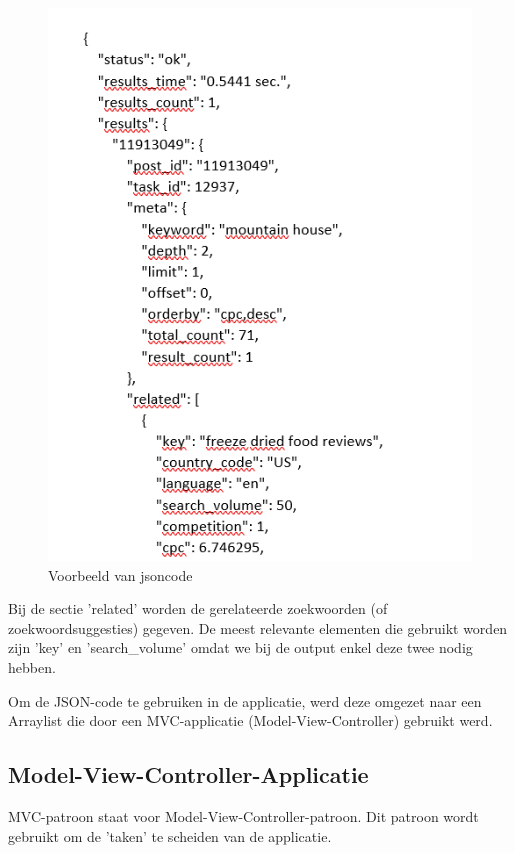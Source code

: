 \begin{figure}[h!]
\centering
\includegraphics[width=\linewidth]{img/jsoncode.PNG}
\caption{Voorbeeld van jsoncode}
\end{figure}

Bij de sectie 'related' worden de gerelateerde zoekwoorden (of zoekwoordsuggesties) gegeven. De meest relevante elementen die gebruikt worden zijn 'key' en 'search\_volume' omdat we bij de output enkel deze twee nodig hebben. 

Om de JSON-code te gebruiken in de applicatie, werd deze omgezet naar een Arraylist die door een MVC-applicatie (Model-View-Controller) gebruikt werd. 

\subsection{Model-View-Controller-Applicatie}
\label{ch: Model-View-Controller-Applicatie}

MVC-patroon staat voor Model-View-Controller-patroon. Dit patroon wordt gebruikt om de 'taken' te scheiden van de applicatie. 

